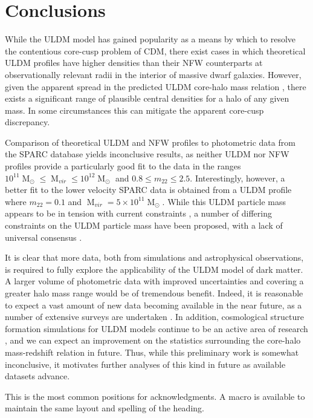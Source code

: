 \documentclass[a4paper,11pt]{article}
\begin{document}
\section{Conclusions}\label{sec:conclusion}

While the ULDM model has gained popularity as a means by which to resolve the contentious core-cusp problem of CDM, there exist cases in which theoretical ULDM profiles have higher densities than their NFW counterparts at observationally relevant radii in the interior of massive dwarf galaxies. However, given the apparent spread in the predicted ULDM core-halo mass relation \cite{Schive:2014hza}, there exists a significant range of plausible central densities for a halo of any given mass. In some circumstances this can mitigate the apparent core-cusp discrepancy. 

Comparison of theoretical ULDM and NFW profiles to photometric data from the SPARC database yields inconclusive results, as neither ULDM nor NFW profiles provide a particularly good fit to the data in the ranges $10^{11}\operatorname{M}_{\odot}\leq \operatorname{M}_{vir} \leq 10^{12}\operatorname{M}_{\odot}$ and $0.8 \leq m_{22} \leq 2.5$. Interestingly, however, a better fit to the lower velocity SPARC data is obtained from a ULDM profile where $m_{22} = 0.1$ and $\operatorname{M}_{vir} = 5\times 10^{11}\operatorname{M}_{\odot}$. While this ULDM particle mass appears to be in tension with current constraints \cite{Amendola:2005ad, Bozek:2014uqa}, a number of differing constraints on the ULDM particle mass have been proposed, with a lack of universal consensus \cite{Armengaud:2017nkf}.

It is clear that more data, both from simulations and astrophysical observations, is required to fully explore the applicability of the ULDM model of dark matter. A larger volume of photometric data with improved uncertainties and covering a greater halo mass range would be of tremendous benefit. Indeed, it is reasonable to expect a vast amount of new data becoming available in the near future, as a number of extensive surveys are undertaken \cite{Simon:2019kmm}. In addition, cosmological structure formation simulations for ULDM models continue to be an active area of research \cite{Lin:2018whl, Clough:2018exo, Mocz:2015sda}, and we can expect an improvement on the statistics surrounding the core-halo mass-redshift relation in future. Thus, while this preliminary work is somewhat inconclusive, it motivates further analyses of this kind in future as available datasets advance. 




\acknowledgments

This is the most common positions for acknowledgments. A macro is
available to maintain the same layout and spelling of the heading.






 
\end{document}
